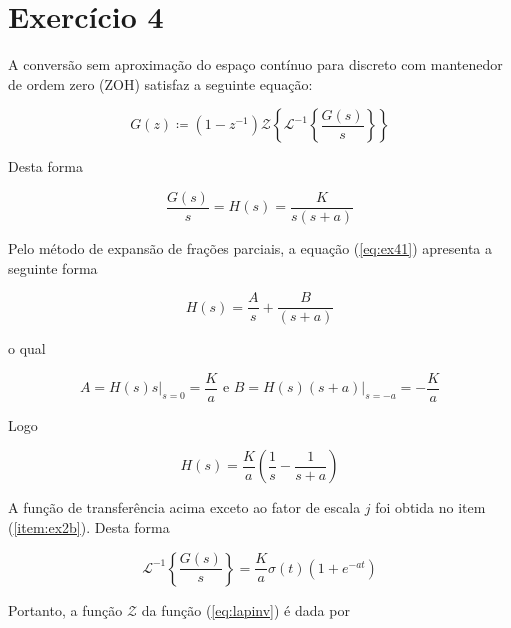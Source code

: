 \section*{Exercício 4}

    A conversão sem aproximação do espaço contínuo para discreto com mantenedor de ordem zero (ZOH) satisfaz a seguinte equação:
    
        \begin{equation}
            G(z) \coloneqq (1-z^{-1}) \mathcal{Z}\left\{\mathcal{L}^{-1}\left\{\frac{G(s)}{s}\right\}\right\}
        \end{equation}
    
    Desta forma
    
        \begin{equation}
            \frac{G(s)}{s} = H(s) = \frac{K}{s(s+a)}
            \label{eq:ex41}
        \end{equation}
    
    Pelo método de expansão de frações parciais, a equação (\ref{eq:ex41}) apresenta a seguinte forma
    
        \begin{equation}
            H(s) = \frac{A}{s} + \frac{B}{(s+a)} 
        \end{equation}
    
    o qual 
    
        \begin{equation}
            A = H(s) s \bigg\rvert_{s=0} = \frac{K}{a} \mbox{ e } B = H(s) (s+a)\bigg\rvert_{s=-a} = -\frac{K}{a}
        \end{equation}
    
    Logo
    
        \begin{equation}
            H(s) = \frac{K}{a} \left( \frac{1}{s} - \frac{1}{s+a} \right)
        \end{equation}
    
    A função de transferência acima exceto ao fator de escala $j$ foi obtida no item (\ref{item:ex2b}). Desta forma
    
        \begin{equation}
            \mathcal{L}^{-1}\left\{\frac{G(s)}{s}\right\} = \frac{K}{a}\sigma(t)\left(1+e^{-at}\right)
            \label{eq:lapinv}
        \end{equation}
    
    Portanto, a função $\mathcal{Z}$ da função (\ref{eq:lapinv}) é dada por
    
